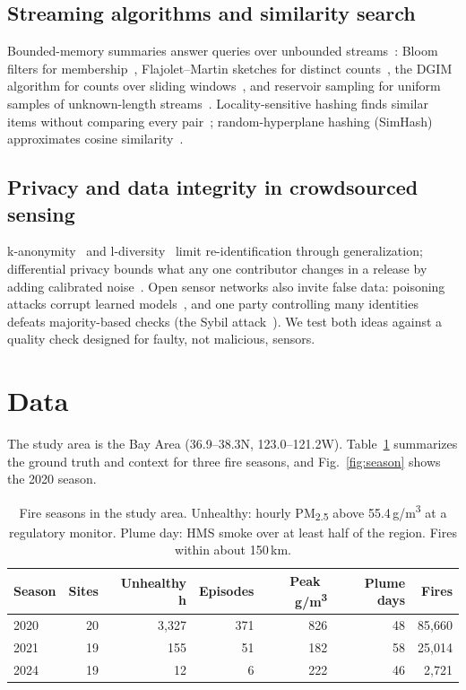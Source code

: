 \documentclass[10pt,journal,compsoc]{IEEEtran}
\newcommand{\ugm}{\,\textmu g/m\textsuperscript{3}}
\begin{document}
\subsection{Streaming algorithms and similarity search}
Bounded-memory summaries answer queries over unbounded streams~\cite{leskovec2020}: Bloom filters for membership~\cite{bloom1970}, Flajolet--Martin sketches for distinct counts~\cite{flajolet1985}, the DGIM algorithm for counts over sliding windows~\cite{datar2002}, and reservoir sampling for uniform samples of unknown-length streams~\cite{vitter1985}. Locality-sensitive hashing finds similar items without comparing every pair~\cite{indyk1998}; random-hyperplane hashing (SimHash) approximates cosine similarity~\cite{charikar2002}.

\subsection{Privacy and data integrity in crowdsourced sensing}
k-anonymity~\cite{sweeney2002} and l-diversity~\cite{machanavajjhala2007} limit re-identification through generalization; differential privacy bounds what any one contributor changes in a release by adding calibrated noise~\cite{dwork2006,dwork2014}. Open sensor networks also invite false data: poisoning attacks corrupt learned models~\cite{biggio2012}, and one party controlling many identities defeats majority-based checks (the Sybil attack~\cite{douceur2002}). We test both ideas against a quality check designed for faulty, not malicious, sensors.

\section{Data}\label{sec:data}
The study area is the Bay Area (36.9--38.3\textdegree N, 123.0--121.2\textdegree W). Table~\ref{tab:seasons} summarizes the ground truth and context for three fire seasons, and Fig.~\ref{fig:season} shows the 2020 season.

\begin{table}[t]
\caption{Fire seasons in the study area. Unhealthy: hourly PM\textsubscript{2.5} above 55.4\ugm{} at a regulatory monitor. Plume day: HMS smoke over at least half of the region. Fires within about 150\,km.}
\label{tab:seasons}
\centering\footnotesize
\setlength{\tabcolsep}{3pt}
\begin{tabular}{lrrrrrr}
\toprule
Season & Sites & Unhealthy h & Episodes & Peak \ugm & Plume days & Fires \\
\midrule
2020 & 20 & 3,327 & 371 & 826 & 48 & 85,660 \\
2021 & 19 & 155 & 51 & 182 & 58 & 25,014 \\
2024 & 19 & 12 & 6 & 222 & 46 & 2,721 \\
\bottomrule
\end{tabular}
\end{table}
\end{document}
